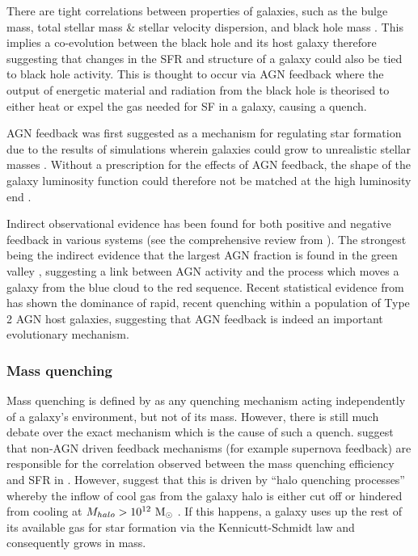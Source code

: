 \documentclass[useAMS,usenatbib]{mn2e}
\begin{document}
There are tight correlations between properties of galaxies, such as the bulge mass, total stellar mass \& stellar velocity dispersion, and black hole mass \citep{magorrian98, marconi03, haringrix04}. This implies a co-evolution between the black hole and its host galaxy therefore suggesting that changes in the SFR and structure of a galaxy could also be tied to black hole activity. This is thought to occur via AGN feedback where the output of energetic material and radiation from the black hole is theorised to either heat or expel the gas needed for SF in a galaxy, causing a quench.

AGN feedback was first suggested as a mechanism for regulating star formation due to the results of simulations wherein galaxies could grow to unrealistic stellar masses \citep{silk98, Bower06, Croton06, somerville08}. Without a prescription for the effects of AGN feedback, the shape of the galaxy luminosity function could therefore not be matched at the high luminosity end \citep{baugh98, baugh05, kauffmann99a, kauffmann99b, somerville01, kitzbichler06}. 

Indirect observational evidence has been found for both positive and negative feedback in various systems (see the comprehensive review from \citealt{fabian12}). The strongest being the indirect evidence that the largest AGN fraction is found in the green valley \citep{cowie08, Hickox09, schawinski10a}, suggesting a link between AGN activity and the process which moves a galaxy from the blue cloud to the red sequence. Recent statistical evidence from \cite{smethurst16} has shown the dominance of rapid, recent quenching within a population of Type 2 AGN host galaxies, suggesting that AGN feedback is indeed an important evolutionary mechanism. 


\subsubsection{Mass quenching}\label{sec:massquench}

Mass quenching is defined by \citet{peng10, peng12} as any quenching mechanism acting independently of a galaxy's environment, but not of its mass. However, there is still much debate over the exact mechanism which is the cause of such a quench. \citet{darvish16} suggest that non-AGN driven feedback mechanisms (for example supernova feedback) are responsible for the correlation observed between the mass quenching efficiency and SFR in \citet{peng10}. However, \citet{gabor15} suggest that this is driven by ``halo quenching processes'' whereby the inflow of cool gas from the galaxy halo is either cut off or hindered from cooling at $M_{halo} > 10^{12}~\rm{M}_{\odot}$ \citep{birnboim03, dekel06}. If this happens, a galaxy uses up the rest of its available gas for star formation via the Kennicutt-Schmidt law \citep{schmidt59, kennicutt98} and consequently grows in mass.
\end{document}
